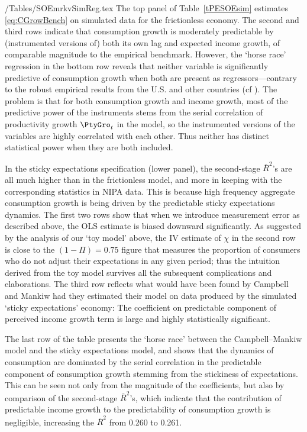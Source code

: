 \econtexRoot/Tables/SOEmrkvSimReg.tex
The top panel of Table~\ref{tPESOEsim} estimates \eqref{eq:CGrowBench} on simulated data for the frictionless economy.  The second and third rows indicate that consumption growth is moderately predictable by (instrumented versions of) both its own lag and expected income growth, of comparable magnitude to the empirical benchmark.  However, the `horse race' regression in the bottom row reveals that neither variable is significantly predictive of consumption growth when both are present as regressors---contrary to the robust empirical results from the U.S. and other countries (cf \cite{cssIntlStickyC}).  The problem is that for both consumption growth and income growth, most of the predictive power of the instruments stems from the serial correlation of productivity growth $\PtyGro_t$ in the model, so the instrumented versions of the variables are highly correlated with each other.  Thus neither has distinct statistical power when they are both included.

In the sticky expectations specification (lower panel), the second-stage $\bar{R}^{2}$'s are all much higher than in the frictionless model, and more in keeping with the corresponding statistics in NIPA data. This is because high frequency aggregate consumption growth is being driven by the predictable sticky expectations dynamics. The first two rows show that when we introduce measurement error as described above, the OLS estimate is biased downward significantly. As suggested by the analysis of our `toy model' above, the IV estimate of $\chi$ in the second row is close to the $(1-\Pi)=0.75$ figure that measures the proportion of consumers who do not adjust their expectations in any given period; thus the intuition derived from the toy model survives all the subsequent complications and elaborations. The third row reflects what would have been found by Campbell and Mankiw had they estimated their model on data produced by the simulated `sticky expectations' economy:  The coefficient on predictable component of perceived income growth term is large and highly statistically significant.

The last row of the table presents the `horse race' between the Campbell--Mankiw model and the sticky expectations model, and shows that the dynamics of consumption are dominated by the serial correlation in the predictable component of consumption growth stemming from the stickiness of expectations.  This can be seen not only from the magnitude of the coefficients, but also by comparison of the second-stage $\bar{R}^{2}$'s, which indicate that the contribution of predictable income growth to the predictability of consumption growth is negligible, increasing the $\bar{R}^2$ from 0.260 to 0.261.


